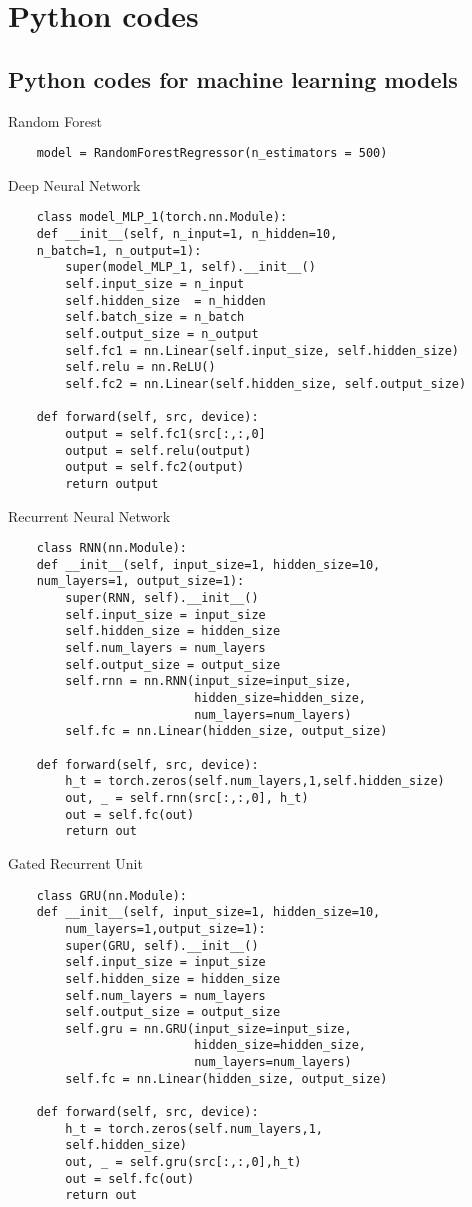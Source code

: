 \chapter{Python codes}
\section{Python codes for machine learning models}
Random Forest
\begin{lstlisting}    
    model = RandomForestRegressor(n_estimators = 500)
    \end{lstlisting}

Deep Neural Network
\begin{lstlisting}
    class model_MLP_1(torch.nn.Module):
    def __init__(self, n_input=1, n_hidden=10, 
    n_batch=1, n_output=1):
        super(model_MLP_1, self).__init__()
        self.input_size = n_input
        self.hidden_size  = n_hidden
        self.batch_size = n_batch
        self.output_size = n_output
        self.fc1 = nn.Linear(self.input_size, self.hidden_size)
        self.relu = nn.ReLU()
        self.fc2 = nn.Linear(self.hidden_size, self.output_size)
        
    def forward(self, src, device):
        output = self.fc1(src[:,:,0]
        output = self.relu(output)
        output = self.fc2(output)
        return output  
    \end{lstlisting}

Recurrent Neural Network
\begin{lstlisting}
    class RNN(nn.Module):
    def __init__(self, input_size=1, hidden_size=10, 
    num_layers=1, output_size=1):
        super(RNN, self).__init__()
        self.input_size = input_size
        self.hidden_size = hidden_size
        self.num_layers = num_layers
        self.output_size = output_size
        self.rnn = nn.RNN(input_size=input_size,
                          hidden_size=hidden_size,
                          num_layers=num_layers)
        self.fc = nn.Linear(hidden_size, output_size)

    def forward(self, src, device):
        h_t = torch.zeros(self.num_layers,1,self.hidden_size)
        out, _ = self.rnn(src[:,:,0], h_t)
        out = self.fc(out)
        return out   

    \end{lstlisting}

Gated Recurrent Unit
\begin{lstlisting} 
    class GRU(nn.Module):
    def __init__(self, input_size=1, hidden_size=10,
        num_layers=1,output_size=1):
        super(GRU, self).__init__()
        self.input_size = input_size
        self.hidden_size = hidden_size
        self.num_layers = num_layers
        self.output_size = output_size
        self.gru = nn.GRU(input_size=input_size,
                          hidden_size=hidden_size,
                          num_layers=num_layers)
        self.fc = nn.Linear(hidden_size, output_size)

    def forward(self, src, device):
        h_t = torch.zeros(self.num_layers,1,
        self.hidden_size)
        out, _ = self.gru(src[:,:,0],h_t)
        out = self.fc(out)
        return out
    \end{lstlisting}

